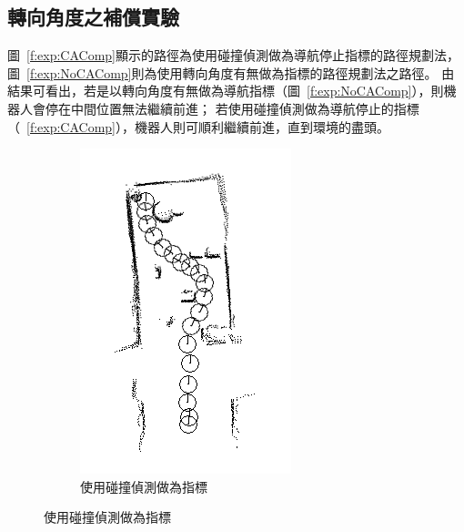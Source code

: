 \subsection{轉向角度之補償實驗}
圖~\ref{f:exp:CAComp}顯示的路徑為使用碰撞偵測做為導航停止指標的路徑規劃法，
圖~\ref{f:exp:NoCAComp}則為使用轉向角度有無做為指標的路徑規劃法之路徑。
由結果可看出，若是以轉向角度有無做為導航指標（圖~\ref{f:exp:NoCAComp}），則機器人會停在中間位置無法繼續前進；
若使用碰撞偵測做為導航停止的指標（~\ref{f:exp:CAComp}），機器人則可順利繼續前進，直到環境的盡頭。
\begin{figure}[h!]
	\centering
	\begin{subfigure}[t]{0.48\textwidth}
		\includegraphics[width=\textwidth]{figures/experiments/path_Comp}
		\caption{使用碰撞偵測做為指標}

\end{subfigure}
\end{figure}
